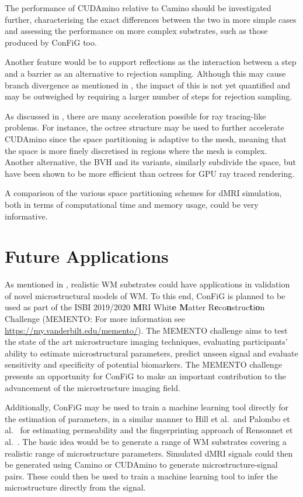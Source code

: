 The performance of CUDAmino relative to Camino should be investigated further, characterising the exact differences between the two in more simple cases and assessing the performance on more complex substrates, such as those produced by ConFiG too. 

Another feature would be to support reflections as the interaction between a step and a barrier as an alternative to rejection sampling.
Although this may cause branch divergence as mentioned in , the impact of this is not yet quantified and may be outweighed by requiring a larger number of steps for rejection sampling.

As discussed in , there are many acceleration possible for ray tracing-like problems.
For instance, the octree structure may be used to further accelerate CUDAmino since the space partitioning is adaptive to the mesh, meaning that the space is more finely discretised in regions where the mesh is complex.
Another alternative, the \acl{BVH} and its variants, similarly subdivide the space, but have been shown to be more efficient than octrees for GPU ray traced rendering\cite{Chajdas2014}.

A comparison of the various space partitioning schemes for \ac{dMRI} simulation, both in terms of computational time and memory usage, could be very informative. 


\section{Future Applications}
\label{sec:future_applications}

As mentioned in , realistic \ac{WM} substrates could have applications in validation of novel microstructural models of \ac{WM}.
To this end, \ac{ConFiG} is planned to be used as part of the ISBI 2019/2020 \textbf{M}RI Whit\textbf{e M}atter R\textbf{e}co\textbf{n}struc\textbf{t}i\textbf{o}n Challenge (MEMENTO: For more information see \url{https://my.vanderbilt.edu/memento/}).
The MEMENTO challenge aims to test the state of the art microstructure imaging techniques, evaluating participants' ability to estimate microstructural parameters, predict unseen signal and evaluate sensitivity and specificity of potential biomarkers.
The MEMENTO challenge presents an opportunity for ConFiG to make an important contribution to the advancement of the microstructure imaging field. 

Additionally, \ac{ConFiG} may be used to train a machine learning tool directly for the estimation of parameters, in a similar manner to Hill et al.\ and Palombo et al.\ \cite{Hill2018,Palombo2018a} for estimating permeability and the fingerprinting approach of Rensonnet et al.\ \cite{Rensonnet2018}.
The basic idea would be to generate a range of \ac{WM} substrates covering a realistic range of microstructure parameters.
Simulated \ac{dMRI} signals could then be generated using Camino or CUDAmino to generate microstructure-signal pairs.
These could then be used to train a machine learning tool to infer the microstructure directly from the signal. 

